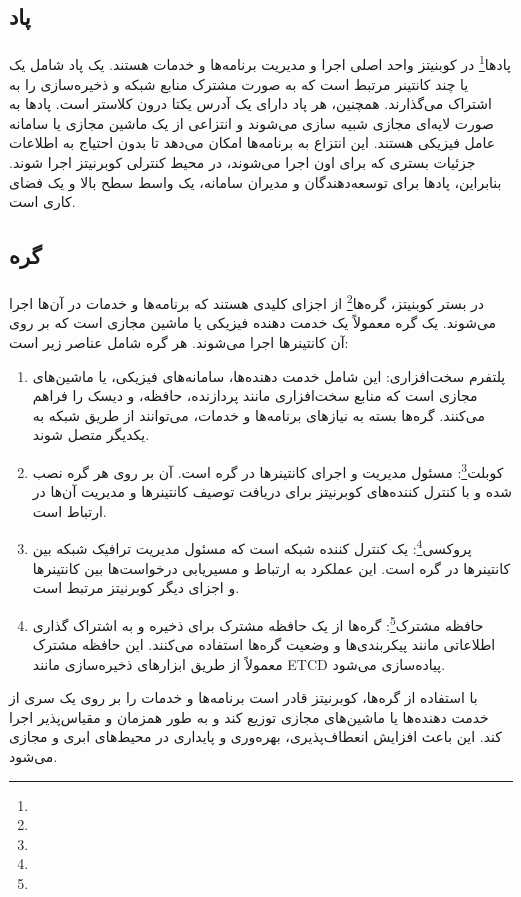 \subsection{پاد}
\label{subsec:pod}
\paragraph{}
{
    پاد‌ها\footnote{} در کوبنیتز واحد اصلی اجرا و مدیریت برنامه‌ها و خدمات هستند. یک پاد شامل یک یا چند کانتینر مرتبط است که به صورت مشترک منابع شبکه و ذخیره‌سازی را به اشتراک می‌گذارند. همچنین، هر پاد دارای یک آدرس یکتا درون کلاستر است. پاد‌ها به صورت لایه‌ای مجازی شبیه سازی می‌شوند و انتزاعی از یک ماشین مجازی یا سامانه عامل فیزیکی هستند. این انتزاع به برنامه‌ها امکان می‌دهد تا بدون احتیاج به اطلاعات جزئیات بستری که برای اون اجرا می‌شوند، در محیط کنترلی کوبرنیتز اجرا شوند. بنابراین، پاد‌ها برای توسعه‌دهندگان و مدیران سامانه، یک واسط سطح بالا و یک فضای کاری است.
}

\subsection{گره}
\label{subsec:node}
\paragraph{}
{
    در بستر کوبنیتز، گره‌ها\footnote{} از اجزای کلیدی هستند که برنامه‌ها و خدمات در آن‌ها اجرا می‌شوند. یک گره 
    معمولاً یک خدمت دهنده‌ فیزیکی یا ماشین مجازی است که بر روی آن کانتینرها اجرا می‌شوند. هر گره شامل عناصر زیر است:
    \begin{enumerate}
        \item پلتفرم سخت‌افزاری: این شامل خدمت دهنده‌ها، سامانه‌های فیزیکی، یا ماشین‌های مجازی است که منابع سخت‌افزاری مانند پردازنده، حافظه، و دیسک را فراهم می‌کنند. گره‌ها بسته به نیازهای برنامه‌ها و خدمات، می‌توانند از طریق شبکه به یکدیگر متصل شوند.
        \item کوبلت\footnote{}: مسئول مدیریت و اجرای کانتینرها در گره است. آن بر روی هر گره نصب شده و با کنترل کننده‌های کوبرنیتز برای دریافت توصیف کانتینرها و مدیریت آن‌ها در ارتباط است.
        \item پروکسی\footnote{}: یک کنترل کننده شبکه است که مسئول مدیریت ترافیک شبکه بین کانتینرها در گره است. این عملکرد به ارتباط و مسیریابی درخواست‌ها بین کانتینرها و اجزای دیگر کوبرنیتز مرتبط است.
        \item حافظه مشترک\footnote{}: گره‌ها از یک حافظه مشترک برای ذخیره و به اشتراک گذاری اطلاعاتی مانند پیکربندی‌ها و وضعیت گره‌ها استفاده می‌کنند. این حافظه مشترک معمولاً از طریق ابزارهای ذخیره‌سازی مانند ETCD پیاده‌سازی می‌شود.
    \end{enumerate}
    با استفاده از گره‌ها، کوبرنیتز قادر است برنامه‌ها و خدمات را بر روی یک سری از خدمت دهنده‌ها یا ماشین‌های مجازی توزیع کند و به طور همزمان و مقیاس‌پذیر اجرا کند. این باعث افزایش انعطاف‌پذیری، بهره‌وری و پایداری در محیط‌های ابری و مجازی می‌شود.
}

